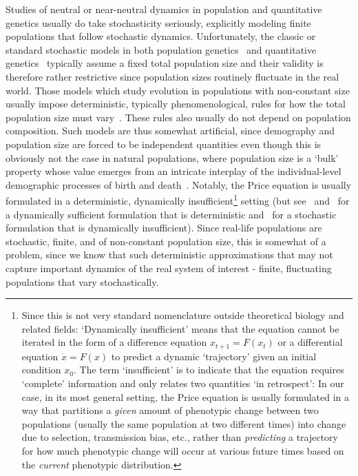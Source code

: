 Studies of neutral or near-neutral dynamics in population and quantitative genetics usually do take stochasticity seriously, explicitly modeling finite populations that follow stochastic dynamics. Unfortunately, the classic or standard stochastic models in both population genetics~\citep{fisher_genetical_1930,wright_evolution_1931, moran_random_1958, kimura_diffusion_1964} and quantitative genetics~\citep{crow_introduction_1970, lande_natural_1976} typically assume a fixed total population size and their validity is therefore rather restrictive since population sizes routinely fluctuate in the real world. Those models which study evolution in populations with non-constant size usually impose deterministic, typically phenomenological, rules for how the total population size must vary~\citep{kimura_probability_1974,ewens_probability_1967,otto_probability_1997, engen_fixation_2009, waxman_unified_2011}. These rules also usually do not depend on population composition. Such models are thus somewhat artificial, since demography and population size are forced to be independent quantities even though this is obviously not the case in natural populations, where population size is a `bulk' property whose value emerges from an intricate interplay of the individual-level demographic processes of birth and death~\citep{metcalf_why_2007}. Notably, the Price equation is usually formulated in a deterministic, dynamically insufficient\footnote{Since this is not very standard nomenclature outside theoretical biology and related fields: `Dynamically insufficient' means that the equation cannot be iterated in the form of a difference equation $x_{t+1} = F(x_t)$ or a differential equation $\dot{x} = F(x)$  to predict a dynamic `trajectory' given an initial condition $x_0$. The term `insufficient' is to indicate that the equation requires `complete' information and only relates two quantities `in retrospect': In our case, in its most general setting, the Price equation is usually formulated in a way that partitions a \emph{given} amount of phenotypic change between two populations (usually the same population at two different times) into change due to selection, transmission bias, etc., rather than \emph{predicting} a trajectory for how much phenotypic change will occur at various future times based on the \emph{current} phenotypic distribution.} setting (but see~\cite{page_unifying_2002} and~\cite{lion_theoretical_2018} for a dynamically sufficient formulation that is deterministic and~\cite{rice_stochastic_2008} for a stochastic formulation that is dynamically insufficient). Since real-life populations are stochastic, finite, and of non-constant population size, this is somewhat of a problem, since we know that such deterministic approximations that may not capture important dynamics of the real system of interest - finite, fluctuating populations that vary stochastically.

